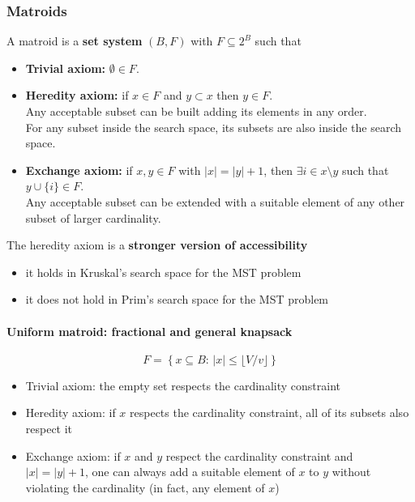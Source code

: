 \newpage

\subsubsection{Matroids}
A matroid is a \textbf{set system} $(B, F)$ with $F \subseteq 2^B$ such that
\begin{itemize}
	\item \textbf{Trivial axiom:} $\emptyset \in F$.\\
	
	\item \textbf{Heredity axiom:} if $x \in F$ and $y \subset x$ then $y \in F$.\\
	Any acceptable subset can be built adding its elements in any order.\\
	For any subset inside the search space, its subsets are also inside the search space.\\
	
	\item \textbf{Exchange axiom:} if $x, y \in F$ with $|x| = |y| + 1$, then $\exists i \in x \setminus y$ such that $y \cup \{i\} \in F$.\\
	Any acceptable subset can be extended with a suitable element of any other subset of larger cardinality.\\
\end{itemize}

The heredity axiom is a \textbf{stronger version of accessibility}
\begin{itemize}
	\item it holds in Kruskal's search space for the MST problem
	\item it does not hold in Prim’s search space for the MST problem
\end{itemize}


\paragraph{Uniform matroid: fractional and general knapsack}
$$ F = \left\{x \subseteq B : \, |x| \leq \lfloor V / v \rfloor \right\}$$

\begin{itemize}
	\item Trivial axiom: the empty set respects the cardinality constraint
	\item Heredity axiom: if $x$ respects the cardinality constraint, all of its subsets also respect it
	\item Exchange axiom: if $x$ and $y$ respect the cardinality constraint and $|x| = |y| + 1$, one can always add a suitable element of $x$ to $y$ without violating the cardinality (in fact, any element of $x$)
\end{itemize}

